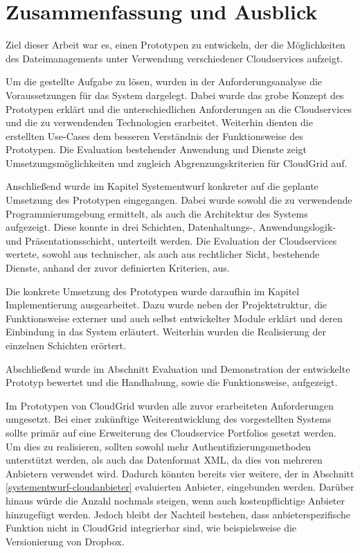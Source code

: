 \chapter{Zusammenfassung und Ausblick}
Ziel dieser Arbeit war es, einen Prototypen zu entwickeln, der die Möglichkeiten des Dateimanagements unter Verwendung verschiedener Cloudservices aufzeigt.

Um die gestellte Aufgabe zu lösen, wurden in der Anforderungsanalyse die Voraussetzungen für das System dargelegt.
Dabei wurde das grobe Konzept des Prototypen erklärt und die unterschiedlichen Anforderungen an die Cloudservices und die zu verwendenden Technologien erarbeitet.
Weiterhin dienten die erstellten Use-Cases dem besseren Verständnis der Funktionsweise des Prototypen.
Die Evaluation bestehender Anwendung und Dienste zeigt Umsetzungsmöglichkeiten und zugleich Abgrenzungskriterien für CloudGrid auf.

Anschließend wurde im Kapitel Systementwurf konkreter auf die geplante Umsetzung des Prototypen eingegangen.
Dabei wurde sowohl die zu verwendende Programmierumgebung ermittelt, als auch die Architektur des Systems aufgezeigt.
Diese konnte in drei Schichten, Datenhaltungs-, Anwendungslogik- und Präsentationsschicht, unterteilt werden.
Die Evaluation der Cloudservices wertete, sowohl aus technischer, als auch aus rechtlicher Sicht, bestehende Dienste, anhand der zuvor definierten Kriterien, aus.

Die konkrete Umsetzung des Prototypen wurde daraufhin im Kapitel Implementierung ausgearbeitet.
Dazu wurde neben der Projektstruktur, die Funktionsweise externer und auch selbst entwickelter Module erklärt und deren Einbindung in das System erläutert.
Weiterhin wurden die Realisierung der einzelnen Schichten erörtert.

Abschließend wurde im Abschnitt Evaluation und Demonstration der entwickelte Prototyp bewertet und die Handhabung, sowie die Funktionsweise, aufgezeigt.

Im Prototypen von CloudGrid wurden alle zuvor erarbeiteten Anforderungen umgesetzt.
Bei einer zukünftige Weiterentwicklung des vorgestellten Systems sollte primär auf eine Erweiterung des Cloudservice Portfolios gesetzt werden.
Um dies zu realisieren, sollten sowohl mehr Authentifizierungsmethoden unterstützt werden, als auch das Datenformat \ac{XML}, da dies von mehreren Anbietern verwendet wird.
Dadurch könnten bereits vier weitere, der in Abschnitt \ref{systementwurf-cloudanbieter} evaluierten Anbieter, eingebunden werden.
Darüber hinaus würde die Anzahl nochmals steigen, wenn auch kostenpflichtige Anbieter hinzugefügt werden.
Jedoch bleibt der Nachteil bestehen, dass anbieterspezifische Funktion nicht in CloudGrid integrierbar sind, wie beispielsweise die Versionierung von Dropbox.

